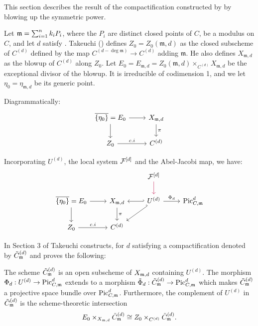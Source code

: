 This section describes the result of the compactification constructed by \cite{takeuchi2019blow} 
by blowing up the symmetric power.

Let $\mdls = \sum_{i=1}^n k_iP_i$, where the $P_i$ are distinct closed
points of $C$, be a modulus on $C$, and let $d$ satisfy
. 
Takeuchi (\cite{takeuchi2019blow}) defines $Z_0=Z_0(\mathfrak{m}, d)$ as the closed subscheme of 
$C^{(d)}$ defined by the map $C^{(d - \deg \mathfrak{m})} \to C^{(d)}$ adding $\mathfrak{m}$. 
He also defines $X_{\mathfrak{m}, d}$ as the blowup of $C^{(d)}$ along $Z_0$.
Let $E_0 = E_{\mathfrak{m},d} = Z_0(\mathfrak{m}, d) \times_{C^{(d)}} X_{\mathfrak{m}, d}$ be the exceptional divisor of the blowup. It is irreducible of codimension 1, and we let $\eta_0=\eta_{\mathfrak{m}, d}$ be its generic point.


Diagrammatically:
\[\begin{tikzcd}
\overline{\{\eta_0 \}} =  E_0 \arrow[r] \arrow[d] & X_{\mdls, d} \arrow[d, "\pi"] \\
Z_0 \arrow[r, "c.i"]           & C^{(d)}          
\end{tikzcd}\] 

Incorporating $U^{(d)}$, the local system $\cF^{[d]}$ and the Abel-Jacobi map, we have:
\[
\begin{tikzcd}
    & & \cF^{[d]} \arrow[d, purple]\\
\overline{\{\eta_0 \}} =  E_0 \arrow[r] \arrow[d] & 
X_{\mdls, d} \arrow[d, "\pi"]  & \arrow[l, hook'] \arrow[dl, hook'] U^{(d)} \arrow[r, "\Phi_d"] & \PicCm[d] \\
Z_0 \arrow[r, "c.i"]           & C^{(d)}          
\end{tikzcd}
\] 

In Section 3 of \cite{takeuchi2019blow} Takeuchi constructs, for $d$ satisfying  a compactification denoted by $\Cmod{d}$ and proves the following:

\begin{theorem}[Takeuchi]\label{theorem:takeuchi-compactification-theorem}
    The scheme $\Cmod{d}$ is an open subscheme of $X_{\mdls,d}$ containing $U^{(d)}$. 
    The morphism $\Phi_d: U^{(d)} \to \PicCm[d]$ extends to a morphism $\tilde{\Phi}_d: \Cmod{d} \to \PicCm[d]$ which makes 
    $\Cmod{d}$ a projective space bundle over $\PicCm[d]$. 
    Furthermore, the complement of $U^{(d)}$ in $\Cmod{d}$ is the scheme-theoretic intersection
    \[
        E_0 \times_{X_{\mdls,d}} \Cmod{d}
        \cong Z_0 \times_{C^{(d)}} \Cmod{d}.
    \]
\end{theorem}


